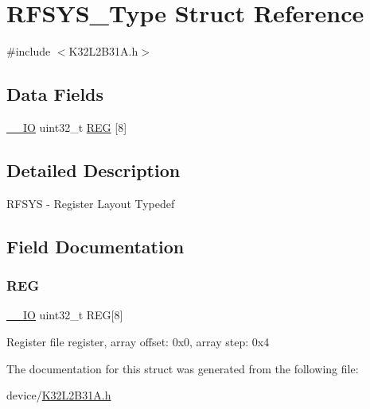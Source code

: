 \hypertarget{struct_r_f_s_y_s___type}{}\section{R\+F\+S\+Y\+S\+\_\+\+Type Struct Reference}
\label{struct_r_f_s_y_s___type}


{\ttfamily \#include $<$K32\+L2\+B31\+A.\+h$>$}

\subsection*{Data Fields}
\begin{DoxyCompactItemize}
\item 
\mbox{\hyperlink{core__cm0plus_8h_aec43007d9998a0a0e01faede4133d6be}{\+\_\+\+\_\+\+IO}} uint32\+\_\+t \mbox{\hyperlink{struct_r_f_s_y_s___type_ad1d411f494430b8bfb7e89e78efd49be}{R\+EG}} \mbox{[}8\mbox{]}
\end{DoxyCompactItemize}


\subsection{Detailed Description}
R\+F\+S\+YS -\/ Register Layout Typedef 

\subsection{Field Documentation}
\mbox{\label{struct_r_f_s_y_s___type_ad1d411f494430b8bfb7e89e78efd49be}} 
\subsubsection{\texorpdfstring{REG}{REG}}
{\footnotesize\ttfamily \mbox{\hyperlink{core__cm0plus_8h_aec43007d9998a0a0e01faede4133d6be}{\+\_\+\+\_\+\+IO}} uint32\+\_\+t R\+EG\mbox{[}8\mbox{]}}

Register file register, array offset\+: 0x0, array step\+: 0x4 

The documentation for this struct was generated from the following file\+:\begin{DoxyCompactItemize}
\item 
device/\mbox{\hyperlink{_k32_l2_b31_a_8h}{K32\+L2\+B31\+A.\+h}}\end{DoxyCompactItemize}
